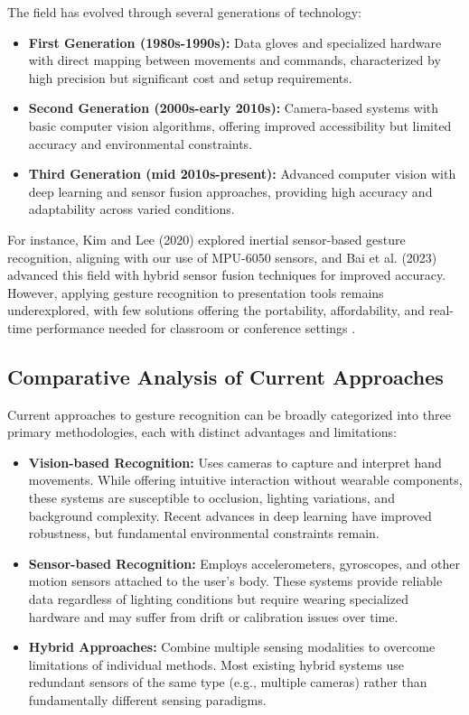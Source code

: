 \documentclass[arxiv,usenatbib]{iupartex}
\begin{document}
The field has evolved through several generations of technology:

\begin{itemize}
  \item \textbf{First Generation (1980s-1990s):} Data gloves and specialized hardware with direct mapping between movements and commands, characterized by high precision but significant cost and setup requirements.
  
  \item \textbf{Second Generation (2000s-early 2010s):} Camera-based systems with basic computer vision algorithms, offering improved accessibility but limited accuracy and environmental constraints.
  
  \item \textbf{Third Generation (mid 2010s-present):} Advanced computer vision with deep learning and sensor fusion approaches, providing high accuracy and adaptability across varied conditions.
\end{itemize}

For instance, Kim and Lee (2020) explored inertial sensor-based gesture recognition, aligning with our use of MPU-6050 sensors, and Bai et al. (2023) advanced this field with hybrid sensor fusion techniques for improved accuracy. However, applying gesture recognition to presentation tools remains underexplored, with few solutions offering the portability, affordability, and real-time performance needed for classroom or conference settings \cite{Lee2019, Hussien2024}.

\subsection{Comparative Analysis of Current Approaches}
Current approaches to gesture recognition can be broadly categorized into three primary methodologies, each with distinct advantages and limitations:

\begin{itemize}
  \item \textbf{Vision-based Recognition:} Uses cameras to capture and interpret hand movements. While offering intuitive interaction without wearable components, these systems are susceptible to occlusion, lighting variations, and background complexity. Recent advances in deep learning have improved robustness, but fundamental environmental constraints remain.
  
  \item \textbf{Sensor-based Recognition:} Employs accelerometers, gyroscopes, and other motion sensors attached to the user's body. These systems provide reliable data regardless of lighting conditions but require wearing specialized hardware and may suffer from drift or calibration issues over time.
  
  \item \textbf{Hybrid Approaches:} Combine multiple sensing modalities to overcome limitations of individual methods. Most existing hybrid systems use redundant sensors of the same type (e.g., multiple cameras) rather than fundamentally different sensing paradigms.
\end{itemize}
\end{document}

